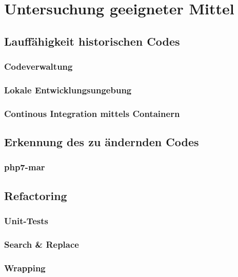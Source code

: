 \chapter{Untersuchung geeigneter Mittel}\label{ch:tools} 

\section{Lauffähigkeit historischen Codes}
\subsection{Codeverwaltung}
\subsection{Lokale Entwicklungsungebung}
\subsection{Continous Integration mittels Containern}

\section{Erkennung des zu ändernden Codes}
\subsection{php7-mar}

\section{Refactoring}
\subsection{Unit-Tests}
\subsection{Search \& Replace}
\subsection{Wrapping}
